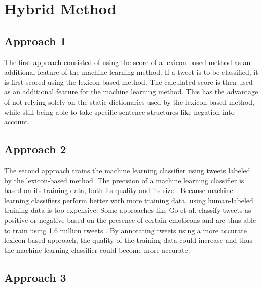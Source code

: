 \section{Hybrid Method}

\subsection{Approach 1}
The first approach consisted of using the score of a lexicon-based method as an additional feature of the machine learning method. If a tweet is to be classified, it is first scored using the lexicon-based method. The calculated score is then used as an additional feature for the machine learning method. This has the advantage of not relying solely on the static dictionaries used by the lexicon-based method, while still being able to take specific sentence structures like negation into account.
\subsection{Approach 2}
The second approach trains the machine learning classifier using tweets labeled by the lexicon-based method. The precision of a machine learning classifier is based on its training data, both its quality and its size \cite{DBLP:journals/csur/GiachanouC16}. Because machine learning classifiers perform better with more training data, using human-labeled training data is too expensive. Some approaches like Go et al. classify tweets as positive or negative based on the presence of certain emoticons and are thus able to train using 1.6 million tweets \cite{GoBHaHua2009}. By annotating tweets using a more accurate lexicon-based approach, the quality of the training data could increase and thus the machine learning classifier could become more accurate.
\subsection{Approach 3}


